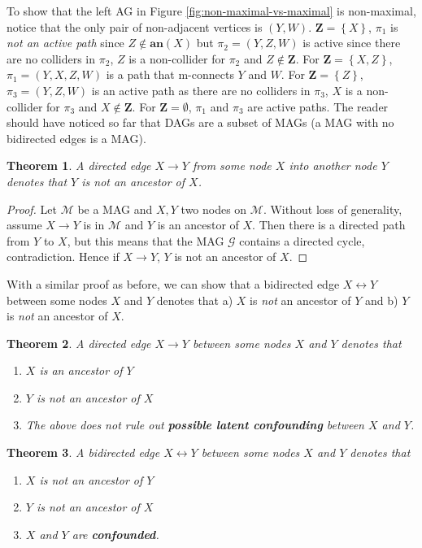 \documentclass[a4paper]{article}
\newtheorem{theorem}{Theorem}
\begin{document}
To show that the left AG in Figure \ref{fig:non-maximal-vs-maximal} is non-maximal, notice that the only pair of non-adjacent vertices is $(Y,W)$. $\mathbf{Z} = \left\{ X\right\}$, $\pi_1$ is \textit{not an active path} since $Z \not \in \textbf{an}(X)$ but $\pi_2 = (Y,Z,W)$ is active since there are no colliders in $\pi_2$, $Z$ is a non-collider for $\pi_2$ and $Z \not \in \mathbf{Z}$. For $\mathbf{Z} = \left\{ X, Z\right\}$, $\pi_1 = (Y,X,Z,W)$ is a path that m-connects $Y$ and $W$. For $\mathbf{Z} = \left\{ Z\right\}$, $\pi_3 = (Y,Z,W)$ is an active path as there are no colliders in $\pi_3$, $X$ is a non-collider for $\pi_3$ and $X \not \in \mathbf{Z}$. For $\mathbf{Z} = \emptyset$, $\pi_1$ and $\pi_3$ are active paths. The reader should have noticed so far that DAGs are a subset of MAGs (a MAG with no bidirected edges is a MAG).

\begin{theorem}
	A directed edge $X \rightarrow Y$ from some node $X$ into another node $Y$ denotes that $Y$ is \textit{not} an ancestor of $X$.
\end{theorem}
\begin{proof}
	Let $\mathcal{M}$ be a MAG and $X,Y$ two nodes on $\mathcal{M}$. Without loss of generality, assume $X \rightarrow Y$ is in $\mathcal{M}$ and $Y$ is an ancestor of $X$. Then there is a directed path from $Y$ to $X$, but this means that the MAG $\mathcal{G}$ contains a directed cycle, contradiction. Hence if $X \rightarrow Y$, $Y$ is not an ancestor of $X$.
\end{proof}

With a similar proof as before, we can show that a bidirected edge $X \leftrightarrow Y$ between some nodes $X$ and $Y$ denotes that a) $X$ is \textit{not} an ancestor of $Y$ and b) $Y$ is \textit{not} an ancestor of $X$.

\begin{theorem}A directed edge $X \rightarrow Y$ between some nodes $X$ and $Y$ denotes that 
	\begin{enumerate}
		\item $X$ is an ancestor of $Y$
		\item $Y$ is not an ancestor of $X$
		\item The above does not rule out \textbf{possible latent confounding} between $X$ and $Y$.
	\end{enumerate}
\end{theorem}

\begin{theorem}A bidirected edge $X \leftrightarrow Y$ between some nodes $X$ and $Y$ denotes that 
\begin{enumerate}
	\item $X$ is \textit{not} an ancestor of $Y$
	\item $Y$ is \textit{not} an ancestor of $X$
	\item $X$ and $Y$ are \textbf{confounded}.
\end{enumerate}
\end{theorem}
\end{document}
